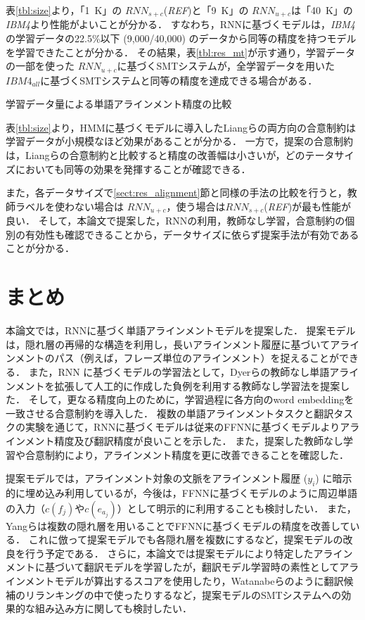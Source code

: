 \documentclass[japanese]{jnlp_1.4}
\begin{document}
表\ref{tbl:size}より，「1~K」の $\mathit{RNN}_{s+c}$({\it REF})と「9~K」の $\mathit{RNN}_{u+c}$は「40~K」の{\it IBM4}より性能がよいことが分かる．
すなわち，RNNに基づくモデルは，{\it IBM4}の学習データの22.5\%以下 (9,000/40,000) のデータから同等の精度を持つモデルを学習できたことが分かる．
その結果，表\ref{tbl:res_mt}が示す通り，学習データの一部を使った $\mathit{RNN}_{u+c}$に基づくSMTシステムが，全学習データを用いた $\mathit{IBM4}_\mathit{all}$に基づくSMTシステムと同等の精度を達成できる場合がある．

\begin{table}[b]
\caption{学習データ量による単語アラインメント精度の比較}
\label{tbl:size}

\end{table}

表\ref{tbl:size}より，HMMに基づくモデルに導入したLiangらの両方向の合意制約は学習データが小規模なほど効果があることが分かる．
一方で，提案の合意制約は，Liangらの合意制約と比較すると精度の改善幅は小さいが，どのテータサイズにおいても同等の効果を発揮することが確認できる．

また，各データサイズで\ref{sect:res_alignment}節と同様の手法の比較を行うと，教師ラベルを使わない場合は $\mathit{RNN}_{u+c}$，使う場合は$\mathit{RNN}_{s+c}$({\it REF})が最も性能が良い．
そして，本論文で提案した，RNNの利用，教師なし学習，合意制約の個別の有効性も確認できることから，データサイズに依らず提案手法が有効であることが分かる．


\section{まとめ}
\label{sect:conclusion}

本論文では，RNNに基づく単語アラインメントモデルを提案した．
提案モデルは，隠れ層の再帰的な構造を利用し，長いアラインメント履歴に基づいてアラインメントのパス（例えば，フレーズ単位のアラインメント）を捉えることができる．
また，RNN に基づくモデルの学習法として，Dyerらの教師なし単語アラインメント\cite{dyer11}を拡張して人工的に作成した負例を利用する教師なし学習法を提案した．
そして，更なる精度向上のために，学習過程に各方向のword embeddingを一致させる合意制約を導入した．
複数の単語アラインメントタスクと翻訳タスクの実験を通じて，RNNに基づくモデルは従来のFFNNに基づくモデル\cite{yang13}よりアラインメント精度及び翻訳精度が良いことを示した．
また，提案した教師なし学習や合意制約により，アラインメント精度を更に改善できることを確認した．

提案モデルでは，アラインメント対象の文脈をアラインメント履歴 ($y_{i}$) に暗示的に埋め込み利用しているが，今後は，FFNNに基づくモデルのように周辺単語の入力（$c(f_{j})$や$c(e_{a_{j}})$）として明示的に利用することも検討したい．
また，Yangらは複数の隠れ層を用いることでFFNNに基づくモデルの精度を改善している\cite{yang13}．
これに倣って提案モデルでも各隠れ層を複数にするなど，提案モデルの改良を行う予定である．
さらに，本論文では提案モデルにより特定したアラインメントに基づいて翻訳モデルを学習したが，翻訳モデル学習時の素性としてアラインメントモデルが算出するスコアを使用したり，Watanabeら\cite{watanabe06}のように翻訳候補のリランキングの中で使ったりするなど，提案モデルのSMTシステムへの効果的な組み込み方に関しても検討したい．
\end{document}
